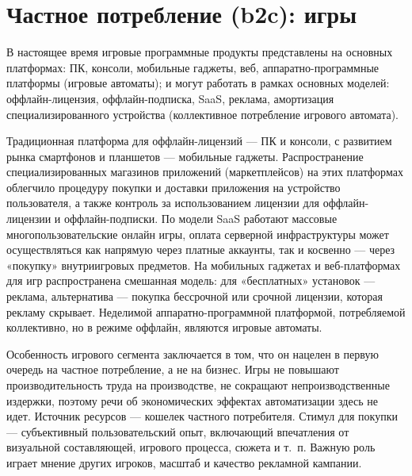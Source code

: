 \documentclass{article}
\begin{document}
\section*{Частное потребление (b2c): игры}

В настоящее время игровые программные продукты представлены на основных платформах: ПК, консоли, мобильные гаджеты, веб, аппаратно-программные платформы (игровые автоматы); и могут работать в рамках основных моделей: оффлайн-лицензия, оффлайн-подписка, SaaS, реклама, амортизация специализированного устройства (коллективное потребление игрового автомата).

Традиционная платформа для оффлайн-лицензий — ПК и консоли, с развитием рынка смартфонов и планшетов — мобильные гаджеты. Распространение специализированных магазинов приложений (маркетплейсов) на этих платформах облегчило процедуру покупки и доставки приложения на устройство пользователя, а также контроль за использованием лицензии для оффлайн-лицензии и оффлайн-подписки. По модели SaaS работают массовые многопользовательские онлайн игры, оплата серверной инфраструктуры может осуществляться как напрямую через платные аккаунты, так и косвенно — через «покупку» внутриигровых предметов. На мобильных гаджетах и веб-платформах для игр распространена смешанная модель: для «бесплатных» установок — реклама, альтернатива — покупка бессрочной или срочной лицензии, которая рекламу скрывает. Неделимой аппаратно-программной платформой, потребляемой коллективно, но в режиме оффлайн, являются игровые автоматы.

Особенность игрового сегмента заключается в том, что он нацелен в первую очередь на частное потребление, а не на бизнес. Игры не повышают производительность труда на производстве, не сокращают непроизводственные издержки, поэтому речи об экономических эффектах автоматизации здесь не идет. Источник ресурсов — кошелек частного потребителя. Стимул для покупки — субъективный пользовательский опыт, включающий впечатления от визуальной составляющей, игрового процесса, сюжета и т.~п. Важную роль играет мнение других игроков, масштаб и качество рекламной кампании.
\end{document}
